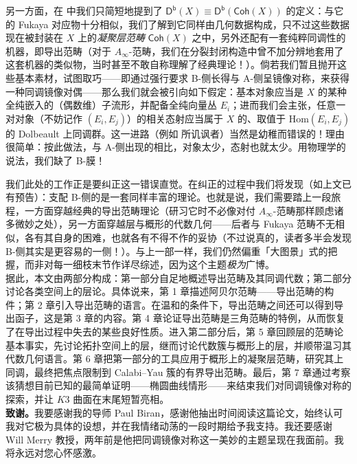 另一方面，在 \cite[第 7.3 节]{[Imp21]} 中我们只简短地提到了 $\mathsf{D^b}(X)\equiv\mathsf{D^b}(\mathsf{Coh}(X))$ 的定义：与它的 Fukaya 对应物十分相似，我们了解到它同样由几何数据构成，只不过这些数据现在被封装在 $X$ 上的\textit{凝聚层范畴} $\mathsf{Coh}(X)$ 之中，另外还配有一套纯粹同调性的机器，即导出范畴（对于 $A_\infty$-范畴，我们在分裂封闭构造中曾不加分辨地套用了这套机器的类似物，当时甚至不敢自称理解了经典理论！）。倘若我们暂且抛开这些基本素材，试图取巧——即通过强行要求 B-侧长得与 A-侧呈镜像对称，来获得一种同调镜像对偶——那么我们就会被引向如下假定：基本对象应当是 $X$ 的某种全纯嵌入的（偶数维）子流形，并配备全纯向量丛 $E_i$；进而我们会主张，任意一对对象（不妨记作 $(E_i,E_j)$）的相关态射应当属于 $X$ 的、取值于 $\text{Hom}(E_i,E_j)$ 的 Dolbeault 上同调群。这一进路（例如 \cite{[Asp04]} 所讥讽者）当然是幼稚而错误的！理由很简单：按此做法，与 A-侧出现的相比，对象太少，态射也就太少。用物理学的说法，我们缺了 B-膜！

我们此处的工作正是要纠正这一错误直觉。在纠正的过程中我们将发现（如上文已有预告）：支配 B-侧的是一套同样丰富的理论。也就是说，我们需要踏上一段旅程，一方面穿越经典的导出范畴理论（研习它时不必像对付 $A_\infty$-范畴那样顾虑诸多微妙之处），另一方面穿越层与概形的代数几何——后者与 Fukaya 范畴不无相似，各有其自身的困难，也就各有不得不作的妥协（不过说真的，读者多半会发现 B-侧其实是更容易的一侧！）。与上一部一样，我们仍然偏重「大图景」式的把握，而非对每一细枝末节作详尽综述，因为这个主题\textit{极为}广博。\\

据此，本文由两部分构成：第一部分自足地概述导出范畴及其同调代数；第二部分讨论各类空间上的层论。具体说来，第 1 章描述阿贝尔范畴——导出范畴的构件；第 2 章引入导出范畴的语言。在温和的条件下，导出范畴之间还可以得到导出函子，这是第 3 章的内容。第 4 章论证导出范畴是三角范畴的特例，从而恢复了在导出过程中失去的某些良好性质。进入第二部分后，第 5 章回顾层的范畴论基本事实，先讨论拓扑空间上的层，继而讨论代数簇与概形上的层，并顺带温习其代数几何语言。第 6 章把第一部分的工具应用于概形上的凝聚层范畴，研究其上同调，最终把焦点限制到 Calabi--Yau 簇的有界导出范畴。最后，第 7 章通过考察该猜想目前已知的最简单证明——椭圆曲线情形——来结束我们对同调镜像对称的探索，并让 $K3$ 曲面在末尾短暂亮相。 \\

\noindent\textbf{致谢。}我要感谢我的导师 Paul Biran，感谢他抽出时间阅读这篇论文，始终认可我对它极为具体的设想，并在我情绪动荡的一段时期给予我支持。我还要感谢 Will Merry 教授，两年前是他把同调镜像对称这一美妙的主题呈现在我面前。我将永远对您心怀感激。
\vspace*{1cm}

